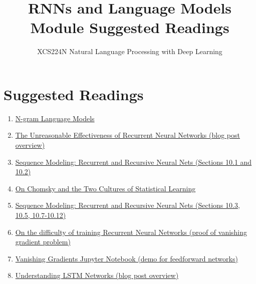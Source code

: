 \documentclass{article}
\title{RNNs and Language Models Module Suggested Readings}
\author{XCS224N Natural Language Processing with Deep Learning}
\date{}
\begin{document}
\maketitle

\section{Suggested Readings}
\begin{enumerate}
    \item \href{https://web.stanford.edu/~jurafsky/slp3/3.pdf}{N-gram Language Models}
    \item \href{http://karpathy.github.io/2015/05/21/rnn-effectiveness/}{The Unreasonable Effectiveness of Recurrent Neural Networks (blog post overview)}
    \item \href{https://www.deeplearningbook.org/contents/rnn.html}{Sequence Modeling: Recurrent and Recursive Neural Nets (Sections 10.1 and 10.2)}
    \item \href{http://norvig.com/chomsky.html}{On Chomsky and the Two Cultures of Statistical Learning}
    \item \href{https://www.deeplearningbook.org/contents/rnn.html}{Sequence Modeling: Recurrent and Recursive Neural Nets (Sections 10.3, 10.5, 10.7-10.12)}
    \item \href{https://arxiv.org/pdf/1211.5063.pdf}{On the difficulty of training Recurrent Neural Networks (proof of vanishing gradient problem)}
    \item \href{https://web.stanford.edu/class/archive/cs/cs224n/cs224n.1174/lectures/vanishing_grad_example.html}{Vanishing Gradients Jupyter Notebook (demo for feedforward networks)}
    \item \href{http://colah.github.io/posts/2015-08-Understanding-LSTMs/}{Understanding LSTM Networks (blog post overview)}
\end{enumerate}
\end{document}
